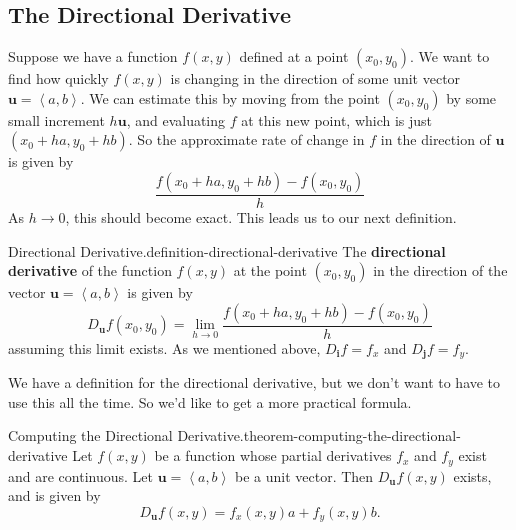 \documentclass[10pt,]{book}
\newcommand{\terminology}[1]{\textbf{#1}}
\numberwithin{equation}{section}
\newcommand{\vv}[1]{\mathbf{#1}}
\newcommand{\dotprod}[1]{\left\langle #1 \right\rangle}
\begin{document}
\subsection[{The Directional Derivative}]{The Directional Derivative}\label{subsection-the-directional-derivative}
\hypertarget{p-1396}{}%
Suppose we have a function \(f(x,y)\) defined at a point \((x_{0},y_{0})\). We want to find how quickly \(f(x,y)\) is changing in the direction of some unit vector \(\vv{u} = \dotprod{a,b}\). We can estimate this by moving from the point \((x_{0},y_{0})\) by some small increment \(h\vv{u}\), and evaluating \(f\) at this new point, which is just \((x_{0} + ha, y_{0} + hb)\). So the approximate rate of change in \(f\) in the direction of \(\vv{u}\) is given by%
\begin{equation*}
\frac{f(x_{0}+ha, y_{0} + hb) - f(x_{0},y_{0})}{h}
\end{equation*}
As \(h\to0\), this should become exact. This leads us to our next definition.%
\begin{definition}{Directional Derivative.}{definition-directional-derivative}%
\hypertarget{p-1397}{}%
The \terminology{directional derivative} of the function \(f(x,y)\) at the point \((x_{0},y_{0})\) in the direction of the vector \(\vv{u} = \dotprod{a,b}\) is given by%
\begin{equation*}
D_{\vv{u}}f(x_{0},y_{0}) = \lim_{h\to0}\frac{f(x_{0}+ha, y_{0} + hb) - f(x_{0},y_{0})}{h}
\end{equation*}
assuming this limit exists. As we mentioned above, \(D_{\vv{i}}f = f_{x}\) and \(D_{\vv{j}}f = f_{y}\).%
\end{definition}
\hypertarget{p-1398}{}%
We have a definition for the directional derivative, but we don't want to have to use this all the time. So we'd like to get a more practical formula.%
\begin{theorem}{Computing the Directional Derivative.}{}{theorem-computing-the-directional-derivative}%
\hypertarget{p-1399}{}%
Let \(f(x,y)\) be a function whose partial derivatives \(f_{x}\) and \(f_{y}\) exist and are continuous. Let \(\vv{u} = \dotprod{a,b}\) be a unit vector. Then \(D_{\vv{u}}f(x,y)\) exists, and is given by%
\begin{equation*}
D_{\vv{u}}f(x,y) = f_{x}(x,y)a + f_{y}(x,y)b.
\end{equation*}
%
\end{theorem}
\end{document}
